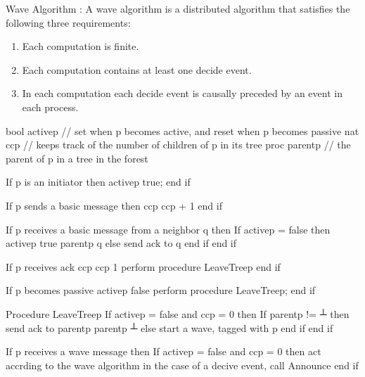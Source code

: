 \documentclass[letterpaper,10pt,english]{sphinxmanual}
\begin{document}
\sphinxAtStartPar
Wave Algorithm : A wave algorithm is a distributed algorithm that satisfies the following three requirements:
\begin{enumerate}
%
\item {} 
\sphinxAtStartPar
{} Each computation is finite.

\item {} 
\sphinxAtStartPar
{} Each computation contains at least one decide event.

\item {} 
\sphinxAtStartPar
{} In each computation each decide event is causally preceded by an event in each process.

\end{enumerate}
\def\sphinxLiteralBlockLabel{\label{\detokenize{docs/ShavitFrancezAlg/algorithm:id9}}\label{\detokenize{docs/ShavitFrancezAlg/algorithm:shavitfranchesterminationdetectionalgorithm}}}
\begin{sphinxVerbatim}[commandchars=\\\{\},numbers=left,firstnumber=1,stepnumber=1]
bool active\PYGZlt{}p\PYGZgt{} // set when p becomes active, and reset when p becomes passive
nat cc\PYGZlt{}p\PYGZgt{} // keeps track of the number of children of p in its tree
proc parent\PYGZlt{}p\PYGZgt{} // the parent of p in a tree in the forest

If p is an initiator then
    active\PYGZlt{}p\PYGZgt{} \PYGZlt{}\PYGZhy{} true;
end if

If p sends a basic message then
    cc\PYGZlt{}p\PYGZgt{} \PYGZlt{}\PYGZhy{} cc\PYGZlt{}p\PYGZgt{} + 1
end if

If p receives a basic message from a neighbor q then
    If active\PYGZlt{}p\PYGZgt{} = false then
        active\PYGZlt{}p\PYGZgt{} \PYGZlt{}\PYGZhy{} true
        parent\PYGZlt{}p\PYGZgt{} \PYGZlt{}\PYGZhy{} q
    else
        send \PYGZlt{}ack\PYGZgt{} to q
    end if
end if

If p receives \PYGZlt{}ack\PYGZgt{}
    cc\PYGZlt{}p\PYGZgt{} \PYGZlt{}\PYGZhy{} cc\PYGZlt{}p\PYGZgt{} \PYGZhy{} 1
    perform procedure LeaveTree\PYGZlt{}p\PYGZgt{}
end if

If p becomes passive
    active\PYGZlt{}p\PYGZgt{} \PYGZlt{}\PYGZhy{} false
    perform procedure LeaveTree\PYGZlt{}p\PYGZgt{};
end if

Procedure LeaveTree\PYGZlt{}p\PYGZgt{}
    If active\PYGZlt{}p\PYGZgt{} = false and cc\PYGZlt{}p\PYGZgt{} = 0 then
        If parent\PYGZlt{}p\PYGZgt{} != ┴ then
            send \PYGZlt{}ack\PYGZgt{} to parent\PYGZlt{}p\PYGZgt{}
            parent\PYGZlt{}p\PYGZgt{} \PYGZlt{}\PYGZhy{} ┴
        else
            start a wave, tagged with p
        end if
    end if

If p receives a wave message then
    If active\PYGZlt{}p\PYGZgt{} = false and cc\PYGZlt{}p\PYGZgt{} = 0 then
        act accrding to the wave algorithm
        in the case of a decive event, call Announce
    end if
\end{sphinxVerbatim}
\end{document}
